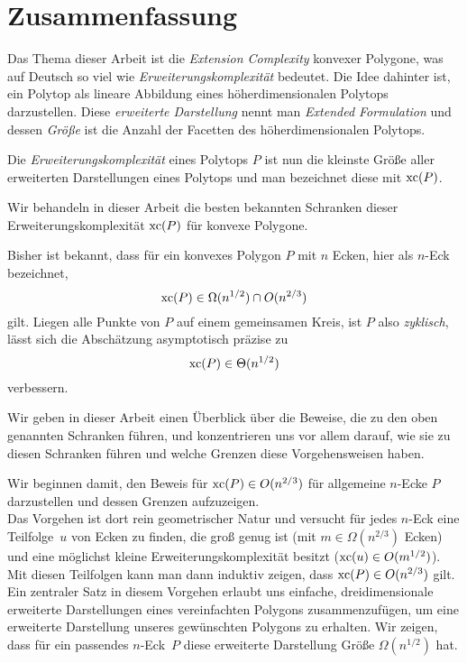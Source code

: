 \section*{Zusammenfassung}

Das Thema dieser Arbeit ist die \emph{Extension Complexity} konvexer Polygone, was auf Deutsch so viel wie \emph{Erweiterungskomplexität} bedeutet. Die Idee dahinter ist, ein Polytop als lineare Abbildung eines höherdimensionalen Polytops darzustellen. Diese \emph{erweiterte Darstellung} nennt man \emph{Extended Formulation} und dessen \emph{Größe} ist die Anzahl der Facetten des höherdimensionalen Polytops.

Die \emph{Erweiterungskomplexität} eines Polytops $P$ ist nun die kleinste Größe aller erweiterten Darstellungen eines Polytops und man bezeichnet diese mit $\operatorname{xc}(P)$.

Wir behandeln in dieser Arbeit die besten bekannten Schranken dieser Erweiterungskomplexität $\operatorname{xc}(P)$ für konvexe Polygone. 

Bisher ist bekannt, dass für ein konvexes Polygon $P$ mit $n$ Ecken, hier als $n$-Eck bezeichnet, $$\operatorname{xc}(P) \in \Omega(n^{1/2}) \cap O(n^{2/3})$$ gilt. Liegen alle Punkte von $P$ auf einem gemeinsamen Kreis, ist $P$ also \emph{zyklisch}, lässt sich die Abschätzung asymptotisch präzise zu $$\operatorname{xc}(P) \in \Theta(n^{1/2})$$ verbessern.

Wir geben in dieser Arbeit einen Überblick über die Beweise, die zu den oben genannten Schranken führen, und konzentrieren uns vor allem darauf, wie sie zu diesen Schranken führen und welche Grenzen diese Vorgehensweisen haben.

Wir beginnen damit, den Beweis für $\operatorname{xc}(P) \in O(n^{2/3})$ für allgemeine $n$-Ecke $P$ darzustellen und dessen Grenzen aufzuzeigen.\\
Das Vorgehen ist dort rein geometrischer Natur und versucht für jedes $n$-Eck eine Teilfolge~$u$ von Ecken zu finden, die groß genug ist (mit $m \in \Omega(n^{2/3})$ Ecken) und eine möglichst kleine Erweiterungskomplexität besitzt ($\operatorname{xc}(u) \in O(m^{1/2})$). Mit diesen Teilfolgen kann man dann induktiv zeigen, dass $\operatorname{xc}(P) \in O(n^{2/3})$ gilt.\\
Ein zentraler Satz in diesem Vorgehen erlaubt uns einfache, dreidimensionale erweiterte Darstellungen eines vereinfachten Polygons zusammenzufügen, um eine erweiterte Darstellung unseres gewünschten Polygons zu erhalten. Wir zeigen, dass für ein passendes \mbox{$n$-Eck $P$} diese erweiterte Darstellung Größe $\Omega(n^{1/2})$ hat.

